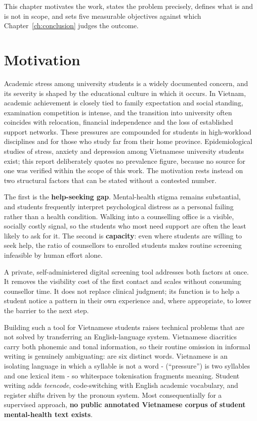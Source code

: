 This chapter motivates the work, states the problem precisely, defines what is and is not in scope, and sets five measurable objectives against which Chapter~\ref{ch:conclusion} judges the outcome.

\section{Motivation}
Academic stress among university students is a widely documented concern, and its severity is shaped by the educational culture in which it occurs. In Vietnam, academic achievement is closely tied to family expectation and social standing, examination competition is intense, and the transition into university often coincides with relocation, financial independence and the loss of established support networks. These pressures are compounded for students in high-workload disciplines and for those who study far from their home province. Epidemiological studies of stress, anxiety and depression among Vietnamese university students exist; this report deliberately quotes no prevalence figure, because no source for one was verified within the scope of this work. The motivation rests instead on two structural factors that can be stated without a contested number.

The first is the \textbf{help-seeking gap}. Mental-health stigma remains substantial, and students frequently interpret psychological distress as a personal failing rather than a health condition. Walking into a counselling office is a visible, socially costly signal, so the students who most need support are often the least likely to ask for it. The second is \textbf{capacity}: even where students are willing to seek help, the ratio of counsellors to enrolled students makes routine screening infeasible by human effort alone.

A private, self-administered digital screening tool addresses both factors at once. It removes the visibility cost of the first contact and scales without consuming counsellor time. It does not replace clinical judgment; its function is to help a student notice a pattern in their own experience and, where appropriate, to lower the barrier to the next step.

Building such a tool for Vietnamese students raises technical problems that are not solved by transferring an English-language system. Vietnamese diacritics carry both phonemic and tonal information, so their routine omission in informal writing is genuinely ambiguating:  are six distinct words. Vietnamese is an isolating language in which a syllable is not a word -  (``pressure'') is two syllables and one lexical item - so whitespace tokenisation fragments meaning. Student writing adds \textit{teencode}, code-switching with English academic vocabulary, and register shifts driven by the pronoun system. Most consequentially for a supervised approach, \textbf{no public annotated Vietnamese corpus of student mental-health text exists}.


